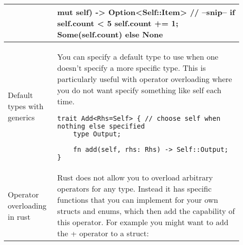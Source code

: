 \documentclass[main.tex,fontsize=8pt,paper=a4,paper=portrait,DIV=calc,]{scrartcl}
\begin{document}
\begin{table}[ht!]
\begin{tabular}{|m{0.2\linewidth}|m{0.755\linewidth}|}
\begin{lstlisting}
    fn next(&mut self) -> Option<Self::Item> {
        // --snip--
        if self.count < 5 {
            self.count += 1;
            Some(self.count)
        } else {
            None
        }
    }
}
\end{lstlisting}\\
\hline
Default types with generics & 
You can specify a default type to use when one doesn't specify a more specific type.\newline
This is particularly useful with operator overloading where you do not want specify something like self each time.\newline
\begin{lstlisting}
trait Add<Rhs=Self> { // choose self when nothing else specified
    type Output;

    fn add(self, rhs: Rhs) -> Self::Output;
}
\end{lstlisting}\\
\hline
Operator overloading in rust & 
Rust does not allow you to overload arbitrary operators for any type.\newline
Instead it has specific functions that you can implement for your own structs and enums, which then add the capability of this operator.\newline
For example you might want to add the + operator to a struct:\\ 
\hline
\end{tabular}
\end{table}
\pagebreak
\end{document}
